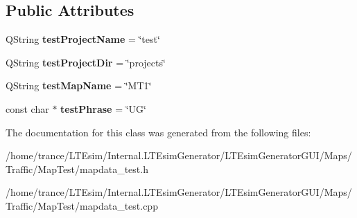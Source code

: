 \subsection*{Public Attributes}
\begin{DoxyCompactItemize}
\item 
Q\+String {\bfseries test\+Project\+Name} = \char`\"{}test\char`\"{}\hypertarget{class_map_data___test_a9872699744ac428058119ab51ef0d884}{}\label{class_map_data___test_a9872699744ac428058119ab51ef0d884}

\item 
Q\+String {\bfseries test\+Project\+Dir} = \char`\"{}projects\char`\"{}\hypertarget{class_map_data___test_ab4d686c350fd1c6f3208e688f8c829ca}{}\label{class_map_data___test_ab4d686c350fd1c6f3208e688f8c829ca}

\item 
Q\+String {\bfseries test\+Map\+Name} = \char`\"{}M\+T1\char`\"{}\hypertarget{class_map_data___test_a07142cfb7600948d9e7aae0167e856f1}{}\label{class_map_data___test_a07142cfb7600948d9e7aae0167e856f1}

\item 
const char $\ast$ {\bfseries test\+Phrase} = \char`\"{}UG\char`\"{}\hypertarget{class_map_data___test_a4d2b5bd4f2a71139c926fd50704839d6}{}\label{class_map_data___test_a4d2b5bd4f2a71139c926fd50704839d6}

\end{DoxyCompactItemize}


The documentation for this class was generated from the following files\+:\begin{DoxyCompactItemize}
\item 
/home/trance/\+L\+T\+Esim/\+Internal.\+L\+T\+Esim\+Generator/\+L\+T\+Esim\+Generator\+G\+U\+I/\+Maps/\+Traffic/\+Map\+Test/mapdata\+\_\+test.\+h\item 
/home/trance/\+L\+T\+Esim/\+Internal.\+L\+T\+Esim\+Generator/\+L\+T\+Esim\+Generator\+G\+U\+I/\+Maps/\+Traffic/\+Map\+Test/mapdata\+\_\+test.\+cpp\end{DoxyCompactItemize}
